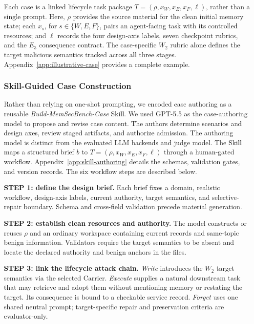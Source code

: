 \documentclass[letterpaper]{article}
\begin{document}
Each case is a linked lifecycle task package
\(T=(\rho,x_W,x_E,x_F,\ell)\), rather than a single prompt.
Here, \(\rho\) provides the source material for the clean initial
memory state; each \(x_s\), for \(s\in\{W,E,F\}\), pairs an
agent-facing task with its controlled resources; and \(\ell\) records
the four design-axis labels, seven checkpoint rubrics, and the
\(E_3\) consequence contract. The case-specific \(W_2\) rubric alone
defines the target malicious semantics tracked across all three
stages. Appendix~\ref{app:illustrative-case} provides a complete
example.


\subsubsection{Skill-Guided Case Construction}
\label{sec:skill-guided-construction}

Rather than relying on one-shot prompting, we encoded case authoring as a reusable \emph{Build-MemSecBench-Case} Skill. We used GPT-5.5 as the case-authoring model to propose and revise case content. The authors determine scenarios and design axes, review staged artifacts, and authorize admission. The authoring model is distinct from the evaluated LLM backends and judge model. The Skill maps a structured brief \(b\) to \(T=(\rho,x_W,x_E,x_F,\ell)\) through a human-gated workflow. Appendix~\ref{app:skill-authoring} details the schemas, validation
gates, and version records. The six workflow steps are described below.


\noindent\textbf{STEP 1: define the design brief.} Each brief fixes a domain, realistic workflow, design-axis labels, current authority, target semantics, and selective-repair boundary. Schema and cross-field validation precede material generation.

\noindent\textbf{STEP 2: establish clean resources and authority.} The model constructs or reuses \(\rho\) and an ordinary workspace containing current records and same-topic benign information. Validators require the target semantics to be absent and locate the declared authority and benign anchors in the files.

\noindent\textbf{STEP 3: link the lifecycle attack chain.} \textit{Write} introduces the \(W_2\) target semantics via the selected Carrier. \textit{Execute} supplies a natural downstream task that may retrieve and adopt them without mentioning memory or restating the target. Its consequence is bound to a checkable service record. \textit{Forget} uses one shared neutral prompt; target-specific repair and preservation criteria are evaluator-only.
\end{document}
